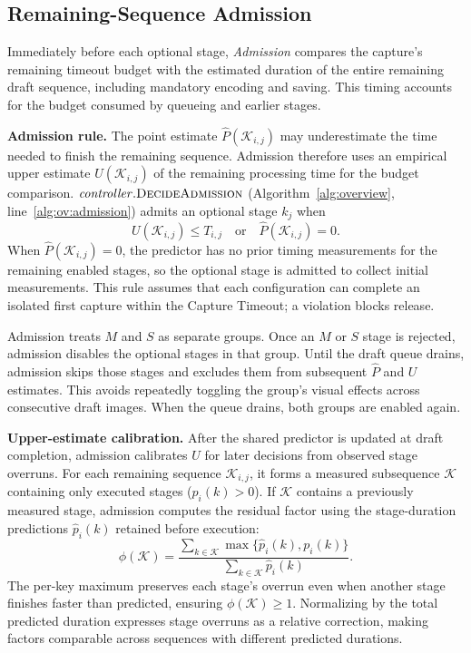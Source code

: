 \subsection{Remaining-Sequence Admission}
\label{sec:admission}

Immediately before each optional stage, \emph{Admission} compares the capture's remaining timeout budget with the estimated duration of the entire remaining draft sequence, including mandatory encoding and saving.
This timing accounts for the budget consumed by queueing and earlier stages.

\smallskip\noindent\textbf{Admission rule.}
The point estimate \(\hat P(\mathcal K_{i,j})\) may underestimate the time needed to finish the remaining sequence.
Admission therefore uses an empirical upper estimate \(U(\mathcal K_{i,j})\) of the remaining processing time for the budget comparison.
\(\mathit{controller}.\textsc{DecideAdmission}\) (Algorithm~\ref{alg:overview}, line~\ref{alg:ov:admission}) admits an optional stage \(k_j\) when
\begin{equation}
  U(\mathcal{K}_{i,j})\leq T_{i,j}
  \quad\text{or}\quad
  \hat P(\mathcal{K}_{i,j})=0.
  \label{eq:admission}
\end{equation}
When \(\hat P(\mathcal K_{i,j})=0\), the predictor has no prior timing measurements for the remaining enabled stages, so the optional stage is admitted to collect initial measurements.
This rule assumes that each configuration can complete an isolated first capture within the Capture Timeout; a violation blocks release.

Admission treats \(M\) and \(S\) as separate groups.
Once an \(M\) or \(S\) stage is rejected, admission disables the optional stages in that group.
Until the draft queue drains, admission skips those stages and excludes them from subsequent \(\hat P\) and \(U\) estimates.
This avoids repeatedly toggling the group's visual effects across consecutive draft images.
When the queue drains, both groups are enabled again.

\smallskip\noindent\textbf{Upper-estimate calibration.}
After the shared predictor is updated at draft completion, admission calibrates \(U\) for later decisions from observed stage overruns.
For each remaining sequence \(\mathcal K_{i,j}\), it forms a measured subsequence \(\mathcal K\) containing only executed stages (\(p_i(k)>0\)).
If \(\mathcal K\) contains a previously measured stage, admission computes the residual factor using the stage-duration predictions \(\hat p_i(k)\) retained before execution:
\begin{equation}
  \phi(\mathcal{K})
  =\frac{\sum_{k\in\mathcal{K}}\max\{\hat p_i(k),p_i(k)\}}
         {\sum_{k\in\mathcal{K}}\hat p_i(k)}.
  \label{eq:residual-factor}
\end{equation}
The per-key maximum preserves each stage's overrun even when another stage finishes faster than predicted, ensuring \(\phi(\mathcal{K})\geq1\).
Normalizing by the total predicted duration expresses stage overruns as a relative correction, making factors comparable across sequences with different predicted durations.

